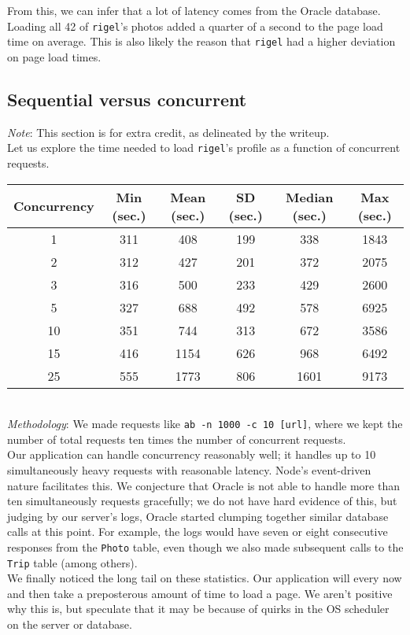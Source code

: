 \documentclass[11pt]{amsart}
\begin{document}
From this, we can infer that a lot of latency comes from the Oracle database. Loading all 42 of
{\tt rigel}'s photos added a quarter of a second to the page load time on average. This is also
likely the reason that {\tt rigel} had a higher deviation on page load times.

\subsection{Sequential versus concurrent}
{\em Note}: This section is for extra credit, as delineated by the writeup. \\

Let us explore the time needed to load {\tt rigel}'s profile as a function of concurrent requests. \\

\begin{tabular}{|c|c|c|c|c|c|}
  \hline {\bf Concurrency} & {\bf Min (sec.)} & {\bf Mean (sec.)} & {\bf SD (sec.)} & 
    {\bf Median (sec.)} & {\bf Max (sec.)} \\
  \hline 1 & 311 & 408 & 199 & 338 & 1843 \\
  \hline 2 & 312 & 427 & 201 & 372 & 2075 \\
  \hline 3 & 316 & 500 & 233 & 429 & 2600 \\
  \hline 5 & 327 & 688 & 492 & 578 & 6925 \\
  \hline 10 & 351 & 744 & 313 & 672 & 3586 \\
  \hline 15 & 416 & 1154 & 626 & 968 & 6492 \\
  \hline 25 & 555 & 1773 & 806 & 1601 & 9173 \\
  \hline
\end{tabular} \\

{\em Methodology}: We made requests like {\tt ab -n 1000 -c 10 [url]}, where we kept the number of
total requests ten times the number of concurrent requests. \\

Our application can handle concurrency reasonably well; it handles up to 10 simultaneously heavy
requests with reasonable latency. Node's event-driven nature facilitates this. We conjecture that
Oracle is not able to handle more than ten simultaneously requests gracefully; we do not have
hard evidence of this, but judging by our server's logs, Oracle started clumping together similar
database calls at this point. For example, the logs would have seven or eight consecutive
responses from the {\tt Photo} table, even though we also made subsequent calls to the {\tt Trip}
table (among others). \\

We finally noticed the long tail on these statistics. Our application will every now and then take
a preposterous amount of time to load a page. We aren't positive why this is, but speculate that it
may be because of quirks in the OS scheduler on the server or database. \\
\end{document}
